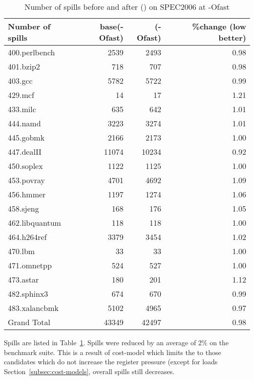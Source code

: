 \documentclass[acmlarge,review,anonymous]{acmart}\settopmatter{printfolios=true}
\begin{document}
\begin{table}[h!]
  \begin{center}
    \begin{tabular}{|l|r|r|r|}
      \hline
Number of spills  &base(-Ofast) &\GCM{}(-Ofast) &\%change (low better) \\\hline
400.perlbench	  & 2539	& 2493	& 0.98 \\\hline
401.bzip2	  & 718	        & 707	& 0.98 \\\hline
403.gcc	          & 5782	& 5722	& 0.99 \\\hline
429.mcf	          & 14	        & 17	& 1.21 \\\hline
433.milc	  & 635	        & 642	& 1.01 \\\hline
444.namd	  & 3223	& 3274	& 1.01 \\\hline
445.gobmk	  & 2166	& 2173	& 1.00 \\\hline
447.dealII	  & 11074	& 10234	& 0.92 \\\hline
450.soplex	  & 1122	& 1125	& 1.00 \\\hline
453.povray	  & 4701	& 4692	& 1.09 \\\hline
456.hmmer	  & 1197	& 1274	& 1.06 \\\hline
458.sjeng	  & 168	        & 176	& 1.05 \\\hline
462.libquantum	  & 118	        & 118	& 1.00 \\\hline
464.h264ref	  & 3379	& 3454	& 1.02 \\\hline
470.lbm	          & 33	        & 33	& 1.00 \\\hline
471.omnetpp	  & 524	        & 527	& 1.00 \\\hline
473.astar	  & 180	        & 201	& 1.12 \\\hline
482.sphinx3	  & 674	        & 670	& 0.99 \\\hline
483.xalancbmk	  & 5102	& 4965	& 0.97 \\\hline
Grand Total	  & 43349	& 42497	& 0.98 \\\hline
    \end{tabular}
  \end{center}
  \caption{Number of spills before and after \gcm{}(\GCM{}) on SPEC2006 at -Ofast}
  \label{tab:spills}
\end{table}

Spills are listed in Table~\ref{tab:spills}. Spills were reduced by an average
of 2\% on the \SPEC{} benchmark suite. This is a result of cost-model which
limits the \gcm{} to those candidates which do not increase the register
pressure (except for loads Section~\ref{subsec:cost-models}, overall spills
still decreases.
\end{document}
